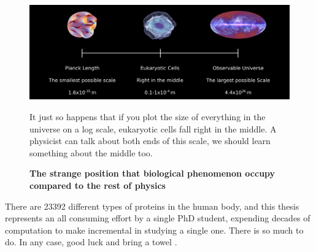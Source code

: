 \begin{figure}
	\begin{center}
		\includegraphics[width=1.0\textwidth]{figures/scales.png}
	\end{center}
	\captionsetup{singlelinecheck = false, justification=raggedright}
	\caption[The strange position that biological phenomenon occupy compared to the rest of physics] {\textbf{The strange position that biological phenomenon occupy compared to the rest of physics}}{It just so happens that if you plot the size of everything  in the universe on a log scale, eukaryotic cells fall right in the middle. A physicist can talk about both ends of this scale, we should learn something about the middle too.}
	\label{biology_scales}
\end{figure}

There are 23392 different types of proteins in the human body, and this thesis represents an all consuming effort by a single PhD student, expending decades of computation to make incremental in studying a single one. There is so much to do. In any case, good luck and bring a towel \cite{adams1979}. 
